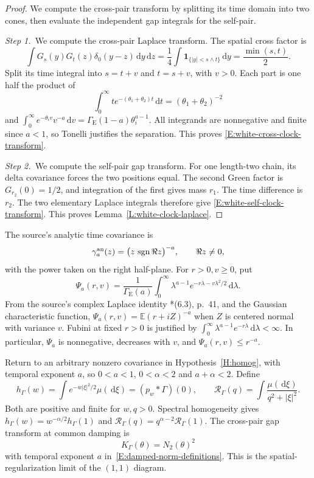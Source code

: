 \documentclass[12pt,oneside,openany]{book}
\numberwithin{equation}{section}
\theoremstyle{nogostyle}
\theoremstyle{definition}
\newcommand{\E}{\mathbb{E}}
\newcommand{\ud}{\,\mathrm{d}}
\begin{document}
\begin{proof}
  We compute the cross-pair transform by splitting its time domain into two
  cones, then evaluate the independent gap integrals for the self-pair.


  \medskip
  \noindent\textit{Step 1.~}We compute the cross-pair Laplace transform.
  The spatial cross factor is
  \[
    \int G_s(y)G_t(z)\delta_0(y-z)\ud y\ud z
    =\frac14\int\mathbf1_{\{|y|<s\wedge t\}}\ud y
    =\frac{\min(s,t)}2.
  \]
  Split its time integral into \(s=t+v\) and \(t=s+v\), with \(v>0\). Each part
  is one half the product of
  \[
    \int_0^\infty t e^{-(\theta_1+\theta_2)t}\ud t
    =(\theta_1+\theta_2)^{-2}
  \]
  and \(\int_0^\infty e^{-\theta_i v}v^{-a}\ud v
  =\Gamma_{\mathrm{E}}(1-a)\theta_i^{a-1}\). All integrands are nonnegative and
  finite since \(a<1\), so Tonelli justifies the separation. This proves
  \eqref{E:white-cross-clock-transform}.


  \medskip
  \noindent\textit{Step 2.~}We compute the self-pair gap transform.
  For one length-two chain, its delta covariance forces the two positions equal.
  The second Green factor is \(G_{r_2}(0)=1/2\), and integration of the first
  gives mass \(r_1\). The time difference is \(r_2\). The two elementary Laplace
  integrals therefore give \eqref{E:white-self-clock-transform}. This proves
  Lemma~\ref{L:white-clock-laplace}.
\end{proof}

The source's analytic time covariance is
\[
  \gamma_a^{\rm an}(z)
  =\big(z\,\operatorname{sgn}\Re z\big)^{-a},\qquad \Re z\ne0,
\]
with the power taken on the right half-plane. For \(r>0,v\ge0\), put
\begin{equation}\label{E:averaged-clock-kernel}
  \Psi_a(r,v)=\frac1{\Gamma_{\mathrm{E}}(a)}
  \int_0^\infty \lambda^{a-1}e^{-r\lambda-v\lambda^2/2}\ud\lambda.
\end{equation}
From the source's complex Laplace identity
\cite{chen:author2026:time-dependency}*{(6.3), p.~41}, and the Gaussian
characteristic function, \(\Psi_a(r,v)=\E(r+iZ)^{-a}\) when \(Z\) is centered
normal with variance \(v\). Fubini at fixed \(r>0\) is justified by
\(\int_0^\infty\lambda^{a-1}e^{-r\lambda}\ud\lambda<\infty\). In particular,
\(\Psi_a\) is nonnegative, decreases with \(v\), and \(\Psi_a(r,v)\le r^{-a}\).

Return to an arbitrary nonzero covariance in Hypothesis~\ref{H:homog}, with
temporal exponent \(a\), so \(0<a<1\), \(0<\alpha<2\) and \(a+\alpha<2\). Define
\[
  h_\Gamma(w)=\int e^{-w|\xi|^2/2}\mu(\ud\xi)
  =(p_w*\Gamma)(0),\qquad
  \mathcal{R}_\Gamma(q)=\int\frac{\mu(\ud\xi)}{q^2+|\xi|^2}.
\]
Both are positive and finite for \(w,q>0\). Spectral homogeneity gives
\(h_\Gamma(w)=w^{-\alpha/2}h_\Gamma(1)\) and
\(\mathcal{R}_\Gamma(q)=q^{\alpha-2}\mathcal{R}_\Gamma(1)\). The cross-pair gap
transform at common damping is
\[
  K_\Gamma(\theta)=N_2(\theta)^2
\]
with temporal exponent \(a\) in~\eqref{E:damped-norm-definitions}. This is the
spatial-regularization limit of the \((1,1)\) diagram.
\end{document}
